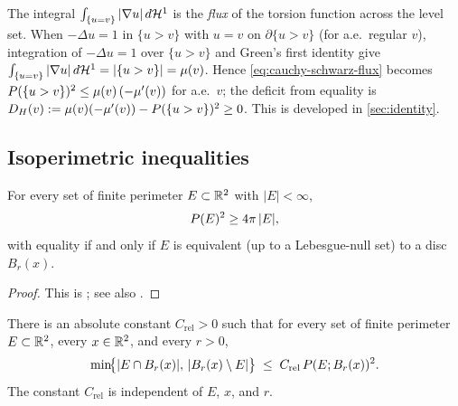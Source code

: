\begin{remark}\label{rem:flux-coarea}
The integral $\int_{\{u=v\}}|\nabla u|\,d\mathcal{H}^1$ is the \emph{flux} of the
torsion function across the level set.  When $-\Delta u = 1$ in $\{u>v\}$ with
$u=v$ on $\partial\{u>v\}$ (for a.e.\ regular $v$), integration of
$-\Delta u = 1$ over $\{u>v\}$ and Green's first identity give
$\int_{\{u=v\}}|\nabla u|\,d\mathcal{H}^1 = |\{u>v\}| = \mu(v)$.  Hence
\eqref{eq:cauchy-schwarz-flux} becomes
$P(\{u>v\})^2\le \mu(v)\,(-\mu'(v))$ for a.e.\ $v$; the deficit from
equality is $D_H(v) := \mu(v)(-\mu'(v)) - P(\{u>v\})^2 \ge 0$.  This is
developed in \cref{sec:identity}.
\end{remark}

\subsection{Isoperimetric inequalities}

\begin{theorem}\label{thm:isoperimetric}
For every set of finite perimeter $E\subset\mathbb{R}^2$ with $|E|<\infty$,
\begin{equation}\label{eq:isoperimetric}
  P(E)^2 \ge 4\pi\,|E|,
\end{equation}
with equality if and only if $E$ is equivalent (up to a Lebesgue-null set)
to a disc $B_r(x)$.
\end{theorem}

\begin{proof}
This is \cite[Theorem~14.1]{Maggi2012}; see also
\cite[Section~5.6, Theorem~5.6]{EvansGariepy2015}.
\end{proof}

\begin{theorem}
\label{thm:rel-isoperimetric}
There is an absolute constant $C_{\mathrm{rel}}>0$ such that for every set of
finite perimeter $E\subset\mathbb{R}^2$, every $x\in\mathbb{R}^2$, and every $r>0$,
\begin{equation}\label{eq:rel-isoperimetric}
  \min\!\bigl\{|E\cap B_r(x)|,\,|B_r(x)\setminus E|\bigr\}
  \;\le\; C_{\mathrm{rel}}\,P(E;B_r(x))^2.
\end{equation}
The constant $C_{\mathrm{rel}}$ is independent of $E$, $x$, and $r$.
\end{theorem}

